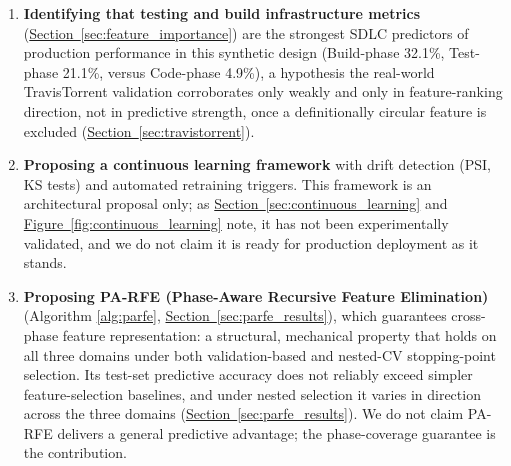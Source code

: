 \documentclass[technologies,article,submit,pdftex,moreauthors]{Definitions/mdpi}
\begin{document}
\begin{enumerate}
  \textbf{Quantifying autoregressive-feature dependence in SDLC performance prediction} (\hyperref[sec:model_perf]{Section~\ref*{sec:model_perf}}): an algebraic-recoverability audit identifies a same-row leakage mode in two of the four AR feature families (\hyperref[sec:temporal_alignment]{Section~\ref*{sec:temporal_alignment}}); under that leaky construction, approximately 88\% of the with-AR gain appears attributable to autoregressive persistence, an artifact of the leakage rather than genuine persistence (\hyperref[sec:internal_validity]{Section~\ref*{sec:internal_validity}}). Under the corrected construction the picture is domain-specific: the reference domain's with-AR advantage all but disappears (its bootstrap CI includes zero, exactly like the without-AR result), and only one of three domains (XYZ Sales Force) has a with-AR result whose own bootstrap CI excludes zero under fixed hyperparameters; even there, a paired-difference test cannot distinguish that result from the same domain's without-AR result (\hyperref[sec:paired_diff]{Section~\ref*{sec:paired_diff}}), and a fairly regularized nested-CV-selected model does not use the AR features at all.
\item
  \textbf{Identifying that testing and build infrastructure metrics} (\hyperref[sec:feature_importance]{Section~\ref*{sec:feature_importance}}) are the strongest SDLC predictors of production performance in this synthetic design (Build-phase 32.1\%, Test-phase 21.1\%, versus Code-phase 4.9\%), a hypothesis the real-world TravisTorrent validation corroborates only weakly and only in feature-ranking direction, not in predictive strength, once a definitionally circular feature is excluded (\hyperref[sec:travistorrent]{Section~\ref*{sec:travistorrent}}).
\item
  \textbf{Proposing a continuous learning framework} with drift detection (PSI, KS tests) and automated retraining triggers. This framework is an architectural proposal only; as \hyperref[sec:continuous_learning]{Section~\ref*{sec:continuous_learning}} and \hyperref[fig:continuous_learning]{Figure~\ref*{fig:continuous_learning}} note, it has not been experimentally validated, and we do not claim it is ready for production deployment as it stands.
\item
  \textbf{Proposing PA-RFE (Phase-Aware Recursive Feature Elimination)} (Algorithm \ref{alg:parfe}, \hyperref[sec:parfe_results]{Section~\ref*{sec:parfe_results}}), which guarantees cross-phase feature representation: a structural, mechanical property that holds on all three domains under both validation-based and nested-CV stopping-point selection. Its test-set predictive accuracy does not reliably exceed simpler feature-selection baselines, and under nested selection it varies in direction across the three domains (\hyperref[sec:parfe_results]{Section~\ref*{sec:parfe_results}}). We do not claim PA-RFE delivers a general predictive advantage; the phase-coverage guarantee is the contribution.

\end{enumerate}
\end{document}

